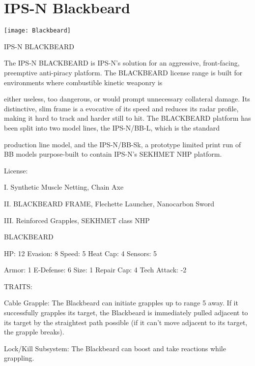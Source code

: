 \section{IPS-N Blackbeard}

\begin{center}
    \texttt{[image: Blackbeard]}
\end{center}


                                         IPS-N BLACKBEARD


The IPS-N BLACKBEARD is IPS-N’s solution for an aggressive, front-facing, preemptive anti-piracy
platform. The BLACKBEARD license range is built for environments where combustible kinetic weaponry is

either useless, too dangerous, or would prompt unnecessary collateral damage. Its distinctive, slim frame is
a evocative of its speed and reduces its radar profile, making it hard to track and harder still to hit. The
BLACKBEARD platform has been split into two model lines, the IPS-N/BB-L, which is the standard

production line model, and the IPS-N/BB-Sk, a prototype limited print run of BB models purpose-built to
contain IPS-N’s SEKHMET NHP platform.

                                                     License:

I. Synthetic Muscle Netting, Chain Axe

II. BLACKBEARD FRAME, Flechette Launcher, Nanocarbon Sword

III. Reinforced Grapples, SEKHMET class NHP


                                                BLACKBEARD

  HP: 12          Evasion: 8                             Speed: 5            Heat Cap: 4        Sensors: 5

  Armor: 1        E-Defense: 6                           Size: 1             Repair Cap: 4      Tech Attack: -2

                                                     TRAITS:

  Cable Grapple: The Blackbeard can initiate grapples up to range 5 away. If it successfully grapples its
  target, the Blackbeard is immediately pulled adjacent to its target by the straightest path possible (if it
  can’t move adjacent to its target, the grapple breaks).

  Lock/Kill Subsystem: The Blackbeard can boost and take reactions while grappling.

